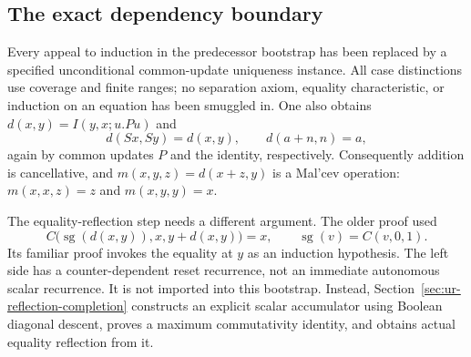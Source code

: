 \subsection{The exact dependency boundary}
Every appeal to induction in the predecessor bootstrap has been replaced
by a specified unconditional common-update uniqueness instance.  All case
distinctions use coverage and finite ranges; no separation axiom, equality
characteristic, or induction on an equation has been smuggled in.
One also obtains $d(x,y)=I(y,x;u.Pu)$ and
\[
 d(Sx,Sy)=d(x,y),\qquad d(a+n,n)=a,
\]
again by common updates $P$ and the identity, respectively.
Consequently addition is cancellative, and
$m(x,y,z)=d(x+z,y)$ is a Mal'cev operation:
$m(x,x,z)=z$ and $m(x,y,y)=x$.

The equality-reflection step needs a different argument.  The older
proof used
\[
 C\bigl(\operatorname{sg}(d(x,y)),x,y+d(x,y)\bigr)=x,
 \qquad \operatorname{sg}(v)=C(v,0,1).
\]
Its familiar proof invokes the equality at $y$ as an induction hypothesis.
The left side has a counter-dependent reset recurrence, not an immediate
autonomous scalar recurrence.  It is not imported into this bootstrap.
Instead, Section~\ref{sec:ur-reflection-completion} constructs an explicit
scalar accumulator using Boolean diagonal descent, proves a maximum
commutativity identity, and obtains actual equality reflection from it.
